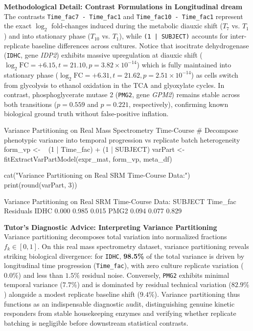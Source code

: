 \documentclass[11pt,twoside,openright]{book}
\begin{document}
\begin{notebox}
\textbf{Methodological Detail: Contrast Formulations in Longitudinal dream}\\
The contrasts \texttt{Time\_fac7 - Time\_fac1} and \texttt{Time\_fac10 - Time\_fac1} represent the exact $\log_2$ fold-changes induced during the metabolic diauxic shift ($T_7$ vs. $T_1$) and into stationary phase ($T_{10}$ vs. $T_1$), while \texttt{(1 | SUBJECT)} accounts for inter-replicate baseline differences across cultures. Notice that isocitrate dehydrogenase (\texttt{IDHC}, gene \textit{IDP2}) exhibits massive upregulation at diauxic shift ($\log_2\text{FC} = +6.15, t = 21.10, p = 3.82 \times 10^{-14}$) which is fully maintained into stationary phase ($\log_2\text{FC} = +6.31, t = 21.62, p = 2.51 \times 10^{-14}$) as cells switch from glycolysis to ethanol oxidation in the TCA and glyoxylate cycles. In contrast, phosphoglycerate mutase 2 (\texttt{PMG2}, gene \textit{GPM2}) remains stable across both transitions ($p = 0.559$ and $p = 0.221$, respectively), confirming known biological ground truth without false-positive inflation.
\end{notebox}

\label{sec:variance_partitioning_lab}
\begin{rchunk}{Variance Partitioning on Real Mass Spectrometry Time-Course}
# Decompose phenotypic variance into temporal progression vs replicate batch heterogeneity
form_vp <- ~ (1 | Time_fac) + (1 | SUBJECT)
varPart <- fitExtractVarPartModel(expr_mat, form_vp, meta_df)

cat("Variance Partitioning on Real SRM Time-Course Data:\n")
print(round(varPart, 3))
\end{rchunk}

\begin{routput}
Variance Partitioning on Real SRM Time-Course Data:
     SUBJECT Time\_fac Residuals
IDHC   0.000    0.985     0.015
PMG2   0.094    0.077     0.829
\end{routput}

\begin{notebox}
\textbf{Tutor's Diagnostic Advice: Interpreting Variance Partitioning}\\
Variance partitioning decomposes total variation into normalized fractions $f_k \in [0, 1]$. On this real mass spectrometry dataset, variance partitioning reveals striking biological divergence: for \texttt{IDHC}, \textbf{98.5\%} of the total variance is driven by longitudinal time progression (\texttt{Time\_fac}), with zero culture replicate variation ($0.0\%$) and less than $1.5\%$ residual noise. Conversely, \texttt{PMG2} exhibits minimal temporal variance ($7.7\%$) and is dominated by residual technical variation ($82.9\%$) alongside a modest replicate baseline shift ($9.4\%$). Variance partitioning thus functions as an indispensable diagnostic audit, distinguishing genuine kinetic responders from stable housekeeping enzymes and verifying whether replicate batching is negligible before downstream statistical contrasts.
\end{notebox}
\end{document}
